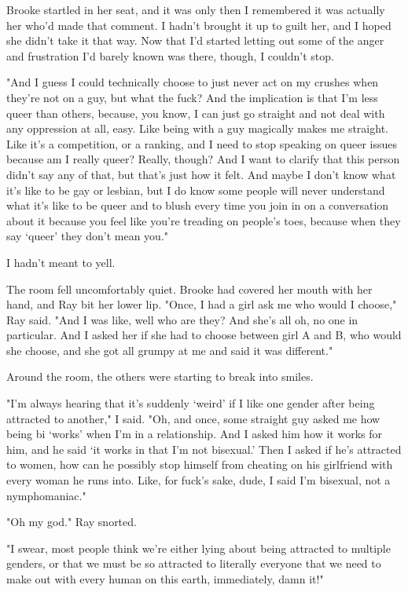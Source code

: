 \documentclass[10pt,a4paper]{article}
\begin{document}
Brooke startled in her seat, and it was only then I remembered it was actually her who'd made that comment. I hadn't brought it up to guilt her, and I hoped she didn't take it that way. Now that I'd started letting out some of the anger and frustration I'd barely known was there, though, I couldn't stop.

"And I guess I could technically choose to just never act on my crushes when they're not on a guy, but what the fuck? And the implication is that I'm less queer than others, because, you know, I can just go straight and not deal with any oppression at all, easy. Like being with a guy magically makes me straight. Like it's a competition, or a ranking, and I need to stop speaking on queer issues because am I really queer? Really, though? And I want to clarify that this person didn't say any of that, but that's just how it felt. And maybe I don't know what it's like to be gay or lesbian, but I do know some people will never understand what it's like to be queer and to blush every time you join in on a conversation about it because you feel like you're treading on people's toes, because when they say `queer' they don't mean you."

I hadn't meant to yell.

The room fell uncomfortably quiet. Brooke had covered her mouth with her hand, and Ray bit her lower lip. "Once, I had a girl ask me who would I choose," Ray said. "And I was like, well who are they? And she's all oh, no one in particular. And I asked her if she had to choose between girl A and B, who would she choose, and she got all grumpy at me and said it was different."

Around the room, the others were starting to break into smiles.

"I'm always hearing that it's suddenly `weird' if I like one gender after being attracted to another," I said. "Oh, and once, some straight guy asked me how being bi `works' when I'm in a relationship. And I asked him how it works for him, and he said `it works in that I'm not bisexual.' Then I asked if he's attracted to women, how can he possibly stop himself from cheating on his girlfriend with every woman he runs into. Like, for fuck's sake, dude, I said I'm bisexual, not a nymphomaniac."

"Oh my god." Ray snorted.

"I swear, most people think we're either lying about being attracted to multiple genders, or that we must be so attracted to literally everyone that we need to make out with every human on this earth, immediately, damn it!"
\end{document}
